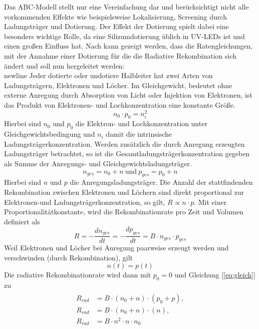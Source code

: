 \vspace{0.1cm}
\noindent
Das ABC-Modell stellt nur eine Vereinfachung dar und berücksichtigt nicht alle vorkommenden Effekte wie beispielsweise Lokalisierung, Screening durch Ladungsträger und Dotierung. 
Der Effekt der Dotierung spielt dabei eine besonders wichtige Rolle, da eine Silizumdotierung üblich in UV-LEDs ist und einen großen Einfluss hat.
Nach \cite{schub} kann gezeigt werden, dass die Ratengleichungen, mit der Annahme einer Dotierung für die 
die Radiative Rekombination sich ändert und soll nun hergeleitet werden:
\\newline
Jeder dotierte oder undotiere Halbleiter hat zwei Arten von Ladungsträgern, Elektronen und Löcher.
Im Gleichgewicht, bedeutet ohne externe Anregung durch Absorption von Licht oder Injektion von Elektronen, ist das Produkt von Elektronen- und Lochkonzentration eine konstante Größe.
\begin{equation}
    n_0 \cdot p_0 = n_i^2
    \label{eq:constant}
\end{equation}
Hierbei sind $n_0$ und $p_0$ die Elektron- und Lochkonzentration unter Gleichgewichtsbedingung und $n_{i}$ damit die intrinsische Ladungsträgerkonzentration.
Werden zusätzlich die durch Anregung erzeugten Ladungsträger betrachtet, so ist die Gesamtladungsträgerkonzentration gegeben als Summe der Anregungs- und Gleichgewichtsladungsträger. 
\begin{equation}
    n_{ges} = n_0 + n \medspace \text{und} \medspace  p_{ges} = p_0 +  n 
\end{equation}
Hierbei sind $ n$ und $p$ die Anregungsladungsträger. 
Die Anzahl der stattfindenden Rekombination zwischen Elektronen und Löchern sind direkt proportional zur Elektronen-und Ladungsträgerkonzentration, so gilt, $R \propto n \cdot p $. Mit einer Proportionalitätkonstante, wird die Rekombinationrate pro Zeit und Volumen definiert als
\begin{equation}
    R = - \frac{dn_{ges}}{dt} = - \frac{dp_{ges}}{dt} = B \cdot n_{ges} \cdot p_{ges}
\end{equation}
Weil Elektronen und Löcher bei Anregung paarweise erzeugt werden und verschwinden (durch Rekombination), gilt
\begin{equation}
    \label{eq:gleich}
    n(t) =  p(t)
\end{equation}
Die radiative Rekombinationrate wird dann mit $p_{0} = 0$ und Gleichung [\ref{eq:gleich}] zu
\begin{align}
\begin{split}
    R_{rad} &= B \cdot (n_0 + n)  \cdot (p_0 + p) ,
    \\
    R_{rad} &= B \cdot (n_0 + n) \cdot (n) ,
    \\
    R_{rad} &= B \cdot n^2 \cdot n \cdot n_0
\end{split}
\end{align}
